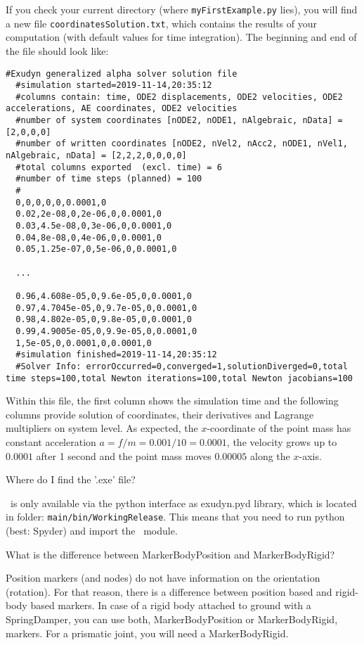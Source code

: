 If you check your current directory (where \texttt{myFirstExample.py} lies), you will find a new file \texttt{coordinatesSolution.txt}, which contains the results of your computation (with default values for time integration).
The beginning and end of the file should look like: \vspace{6pt}\\
{\ttfamily \footnotesize
\begin{lstlisting}[breaklines=true]
  #Exudyn generalized alpha solver solution file
  #simulation started=2019-11-14,20:35:12
  #columns contain: time, ODE2 displacements, ODE2 velocities, ODE2 accelerations, AE coordinates, ODE2 velocities
  #number of system coordinates [nODE2, nODE1, nAlgebraic, nData] = [2,0,0,0]
  #number of written coordinates [nODE2, nVel2, nAcc2, nODE1, nVel1, nAlgebraic, nData] = [2,2,2,0,0,0,0]
  #total columns exported  (excl. time) = 6
  #number of time steps (planned) = 100
  #
  0,0,0,0,0,0.0001,0
  0.02,2e-08,0,2e-06,0,0.0001,0
  0.03,4.5e-08,0,3e-06,0,0.0001,0
  0.04,8e-08,0,4e-06,0,0.0001,0
  0.05,1.25e-07,0,5e-06,0,0.0001,0

  ...

  0.96,4.608e-05,0,9.6e-05,0,0.0001,0
  0.97,4.7045e-05,0,9.7e-05,0,0.0001,0
  0.98,4.802e-05,0,9.8e-05,0,0.0001,0
  0.99,4.9005e-05,0,9.9e-05,0,0.0001,0
  1,5e-05,0,0.0001,0,0.0001,0
  #simulation finished=2019-11-14,20:35:12
  #Solver Info: errorOccurred=0,converged=1,solutionDiverged=0,total time steps=100,total Newton iterations=100,total Newton jacobians=100
\end{lstlisting}
}

Within this file, the first column shows the simulation time and the following columns provide solution of coordinates, their derivatives and Lagrange multipliers on system level. As expected, the $x$-coordinate of the point mass has constant acceleration $a=f/m=0.001/10=0.0001$, the velocity grows up to $0.0001$ after 1 second and the point mass moves $0.00005$ along the $x$-axis.
%

\bn
  \item Where do I find the '.exe' file?
	\bi
	\item[$\ra$] \codeName\ is only available via the python interface as exudyn.pyd library, which is located in folder: \texttt{main/bin/WorkingRelease}. This means that you need to run python (best: Spyder) and import the \codeName\ module.
	\ei
  \item What is the difference between MarkerBodyPosition and MarkerBodyRigid?
	\bi
	\item[$\ra$] Position markers (and nodes) do not have information on the orientation (rotation). For that reason, there is a difference between position based and rigid-body based markers. In case of a rigid body attached to ground with a SpringDamper, you can use both, MarkerBodyPosition or MarkerBodyRigid, markers. For a prismatic joint, you will need a MarkerBodyRigid.
	\ei
\en


